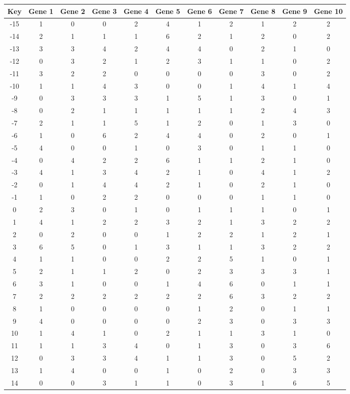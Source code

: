 \begin{tabular}{|c|c|c|c|c|c|c|c|c|c|c|}
\hline
Key & Gene 1 & Gene 2 & Gene 3 & Gene 4 & Gene 5 & Gene 6 & Gene 7 & Gene 8 & Gene 9 & Gene 10 \\
\hline
-15 & 1 & 0 & 0 & 2 & 4 & 1 & 2 & 1 & 2 & 2 \\
-14 & 2 & 1 & 1 & 1 & 6 & 2 & 1 & 2 & 0 & 2 \\
-13 & 3 & 3 & 4 & 2 & 4 & 4 & 0 & 2 & 1 & 0 \\
-12 & 0 & 3 & 2 & 1 & 2 & 3 & 1 & 1 & 0 & 2 \\
-11 & 3 & 2 & 2 & 0 & 0 & 0 & 0 & 3 & 0 & 2 \\
-10 & 1 & 1 & 4 & 3 & 0 & 0 & 1 & 4 & 1 & 4 \\
-9 & 0 & 3 & 3 & 3 & 1 & 5 & 1 & 3 & 0 & 1 \\
-8 & 0 & 2 & 1 & 1 & 1 & 1 & 1 & 2 & 4 & 3 \\
-7 & 2 & 1 & 1 & 5 & 1 & 2 & 0 & 1 & 3 & 0 \\
-6 & 1 & 0 & 6 & 2 & 4 & 4 & 0 & 2 & 0 & 1 \\
-5 & 4 & 0 & 0 & 1 & 0 & 3 & 0 & 1 & 1 & 0 \\
-4 & 0 & 4 & 2 & 2 & 6 & 1 & 1 & 2 & 1 & 0 \\
-3 & 4 & 1 & 3 & 4 & 2 & 1 & 0 & 4 & 1 & 2 \\
-2 & 0 & 1 & 4 & 4 & 2 & 1 & 0 & 2 & 1 & 0 \\
-1 & 1 & 0 & 2 & 2 & 0 & 0 & 0 & 1 & 1 & 0 \\
0 & 2 & 3 & 0 & 1 & 0 & 1 & 1 & 1 & 0 & 1 \\
1 & 4 & 1 & 2 & 2 & 3 & 2 & 1 & 3 & 2 & 2 \\
2 & 0 & 2 & 0 & 0 & 1 & 2 & 2 & 1 & 2 & 1 \\
3 & 6 & 5 & 0 & 1 & 3 & 1 & 1 & 3 & 2 & 2 \\
4 & 1 & 1 & 0 & 0 & 2 & 2 & 5 & 1 & 0 & 1 \\
5 & 2 & 1 & 1 & 2 & 0 & 2 & 3 & 3 & 3 & 1 \\
6 & 3 & 1 & 0 & 0 & 1 & 4 & 6 & 0 & 1 & 1 \\
7 & 2 & 2 & 2 & 2 & 2 & 2 & 6 & 3 & 2 & 2 \\
8 & 1 & 0 & 0 & 0 & 0 & 1 & 2 & 0 & 1 & 1 \\
9 & 4 & 0 & 0 & 0 & 0 & 2 & 3 & 0 & 3 & 3 \\
10 & 1 & 4 & 1 & 0 & 2 & 1 & 1 & 3 & 1 & 0 \\
11 & 1 & 1 & 3 & 4 & 0 & 1 & 3 & 0 & 3 & 6 \\
12 & 0 & 3 & 3 & 4 & 1 & 1 & 3 & 0 & 5 & 2 \\
13 & 1 & 4 & 0 & 0 & 1 & 0 & 2 & 0 & 3 & 3 \\
14 & 0 & 0 & 3 & 1 & 1 & 0 & 3 & 1 & 6 & 5 \\
\hline
\end{tabular}